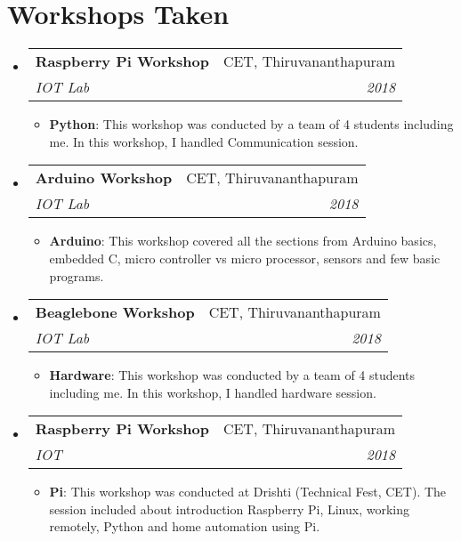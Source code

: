 \documentclass[letterpaper,11pt]{article}
\makeatletter
\newcommand{\resumeItem}[2]{
  \item\small{
    \textbf{#1}{: #2 \vspace{-2pt}}
  }
}
\newcommand{\resumeSubheading}[4]{
  \vspace{-1pt}\item
    \begin{tabular*}{0.97\textwidth}[t]{l@{\extracolsep{\fill}}r}
      \textbf{#1} & #2 \\
      \textit{\small#3} & \textit{\small #4} \\
    \end{tabular*}\vspace{-5pt}
}
\newcommand{\resumeSubHeadingListStart}{\begin{itemize}[leftmargin=*]}
\newcommand{\resumeSubHeadingListEnd}{\end{itemize}}
\newcommand{\resumeItemListStart}{\begin{itemize}}
\newcommand{\resumeItemListEnd}{\end{itemize}\vspace{-5pt}}
\makeatother
\begin{document}
\section{Workshops Taken}
  \resumeSubHeadingListStart
    \resumeSubheading
      {Raspberry Pi Workshop}{CET, Thiruvananthapuram}
      {IOT Lab}{2018}
      \resumeItemListStart
        \resumeItem{Python}
          {This workshop was conducted by a team of 4 students including me. In this workshop, I handled Communication session.}
      \resumeItemListEnd
      \resumeSubheading
      {Arduino Workshop}{CET, Thiruvananthapuram}
      {IOT Lab}{2018}
      \resumeItemListStart
        \resumeItem{Arduino}
          {This workshop covered all the sections from Arduino basics, embedded C, micro controller vs micro processor, sensors and few basic programs.}
      \resumeItemListEnd
      
      \resumeSubheading
      {Beaglebone Workshop}{CET, Thiruvananthapuram}
      {IOT Lab}{2018}
      \resumeItemListStart
        \resumeItem{Hardware}
          {This workshop was conducted by a team of 4 students including me. In this workshop, I handled hardware session.}
      \resumeItemListEnd
      
      \resumeSubheading
      {Raspberry Pi Workshop}{CET, Thiruvananthapuram}
      {IOT}{2018}
      \resumeItemListStart
        \resumeItem{Pi}
          {This workshop was conducted at Drishti (Technical Fest, CET). The session included about introduction Raspberry Pi, Linux, working remotely, Python and home automation using Pi.}
      \resumeItemListEnd
      
  \resumeSubHeadingListEnd
  
\end{document}
